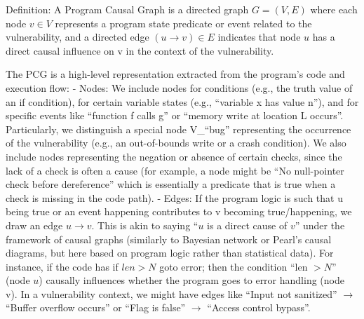 \documentclass[conference,compsoc]{IEEEtran}
\begin{document}
Definition: A Program Causal Graph is a directed graph \(G = (V, E)\) where
each node \(v \in V\) represents a program state predicate or event related to
the vulnerability, and a directed edge \((u \rightarrow v) \in E\) indicates that node \(u\) has
a direct causal influence on v in the context of the vulnerability.

The PCG is a high-level representation extracted from the program's code
and execution flow: - Nodes: We include nodes for conditions (e.g., the
truth value of an if condition), for certain variable states (e.g.,
``variable x has value n''), and for specific events like ``function f
calls g'' or ``memory write at location L occurs''. Particularly, we
distinguish a special node V\_``bug'' representing the occurrence of the
vulnerability (e.g., an out-of-bounds write or a crash condition). We
also include nodes representing the negation or absence of certain
checks, since the lack of a check is often a cause (for example, a node
might be ``No null-pointer check before dereference'' which is
essentially a predicate that is true when a check is missing in the code
path). - Edges: If the program logic is such that u being true or an
event happening contributes to v becoming true/happening, we draw an
edge \(u \rightarrow v\). This is akin to saying ``\(u\) is a direct cause of \(v\)'' under the
framework of causal graphs (similarly to Bayesian network or Pearl's
causal diagrams, but here based on program logic rather than statistical
data). For instance, if the code has if \(len > N\) goto
error; then the condition ``len \(> N\)'' (node \(u\)) causally
influences whether the program goes to error handling (node v). In a
vulnerability context, we might have edges like ``Input not sanitized''
\(\rightarrow\) ``Buffer overflow occurs'' or ``Flag is false''
\(\rightarrow\) ``Access control bypass''.
\end{document}
